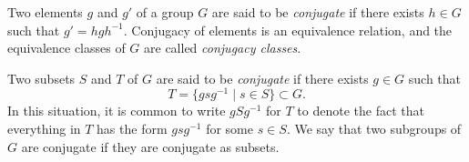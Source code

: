 \documentclass[12pt]{article}
\begin{document}
Two elements $g$ and $g'$ of a group $G$ are said to be {\em conjugate} if there exists $h \in G$ such that $g' = hgh^{-1}$. Conjugacy of elements is an equivalence relation, and the equivalence classes of $G$ are called {\em conjugacy classes}.

Two subsets $S$ and $T$ of $G$ are said to be {\em conjugate} if there exists $g \in G$ such that
$$
T = \{gsg^{-1} \mid s \in S\} \subset G.
$$
In this situation, it is common to write $gSg^{-1}$ for $T$ to denote the fact that everything in $T$ has the form $gsg^{-1}$ for some $s \in S$. We say that two subgroups of $G$ are conjugate if they are conjugate as subsets.
\end{document}
